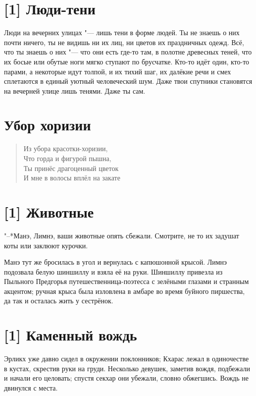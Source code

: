 \section{[1] Люди-тени}

Люди на вечерних улицах "--- лишь тени в форме людей.
Ты не знаешь о них почти ничего, ты не видишь ни их лиц, ни цветов их праздничных одежд.
Всё, что ты знаешь о них "--- что они есть где-то там, в полотне древесных теней, что их босые или обутые ноги мягко ступают по брусчатке.
Кто-то идёт один, кто-то парами, а некоторые идут толпой, и их тихий шаг, их далёкие речи и смех сплетаются в единый уютный человеческий шум.
Даже твои спутники становятся на вечерней улице лишь тенями.
Даже ты сам.

\section{Убор хоризии}

\begin{verse}
Из убора красотки-хоризии,\\
Что горда и фигурой пышна,\\
Ты принёс драгоценный цветок\\
И мне в волосы вплёл на закате\ldotst
\end{verse}

\section{[1] Животные}

"--*Манэ, Лимнэ, ваши животные опять сбежали.
Смотрите, не то их задушат коты или заклюют курочки.

Манэ тут же бросилась в угол и вернулась с капюшонной крысой.
Лимнэ подозвала белую шиншиллу и взяла её на руки.
Шиншиллу привезла из Пыльного Предгорья путешественница-поэтесса с зелёными глазами и странным акцентом;
ручная крыса была изловлена в амбаре во время буйного пиршества, да так и осталась жить у сестрёнок.

\section{[1] Каменный вождь}

Эрликх уже давно сидел в окружении поклонников;
Кхарас лежал в одиночестве в кустах, скрестив руки на груди.
Несколько девушек, заметив вождя, подбежали и начали его целовать;
спустя секхар они убежали, словно обжегшись.
Вождь не двинулся с места.

